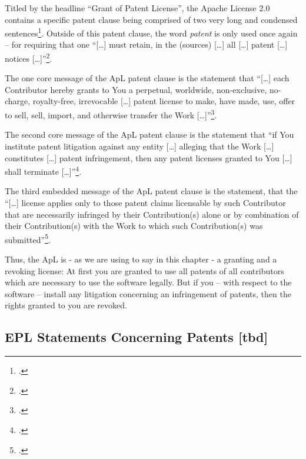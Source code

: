 Titled by the headline \enquote{Grant of Patent License}, the Apache License 2.0
contains a specific patent clause being comprised of two very long and condensed
sentences\footcite[cf.][\nopage wp. §3]{Apl20OsiLicense2004a}. Outside of this
patent clause, the word \emph{patent} is only used once again -- for requiring
that one \enquote{[\ldots] must retain, in the (sources) [\ldots] all [\ldots]
patent [\ldots] notices [\ldots]}\footcite[cf.][\nopage wp.
§4.3]{Apl20OsiLicense2004a}.

The one core message of the ApL patent clause is the statement that
\enquote{[\ldots] each Contributor hereby grants to You a perpetual, worldwide,
non-exclusive, no-charge, royalty-free, irrevocable [\ldots] patent license to
make, have made, use, offer to sell, sell, import, and otherwise transfer the
Work [\ldots]}\footcite[cf.][\nopage wp. §3. \enquote{Contributor},
\enquote{Work} and \enquote{You} are defined §1: \emph{Contributor} refers to
the original licensor and to all others whose contributions have been
incorporated into the Work. The \emph{Work} denotes the result of the
development process regardless of its form. \emph{You} denote the
licensees.]{Apl20OsiLicense2004a}.

The second core message of the ApL patent clause is the statement that
\enquote{if You institute patent litigation against any entity [\ldots] alleging
that the Work [\ldots] constitutes [\ldots] patent infringement, then any patent
licenses granted to You [\ldots] shall terminate [\ldots]}\footcite[cf.][\nopage
wp. §3]{Apl20OsiLicense2004a}.

The third embedded message of the ApL patent clause is the statement, that the
\enquote{[\ldots] license applies only to those patent claims licensable by such
Contributor that are necessarily infringed by their Contribution(s) alone or by
combination of their Contribution(s) with the Work to which such Contribution(s)
was submitted}\footcite[cf.][\nopage wp. §3]{Apl20OsiLicense2004a}.

Thus, the ApL is - as we are using to say in this chapter - a granting and a
revoking license: At first you are granted to use all patents of all
contributors which are necessary to use the software legally. But if you -- with
respect to the software -- install any litigation concerning an infringement of
patents, then the rights granted to you are revoked.


\subsection{EPL Statements Concerning Patents [tbd]}

